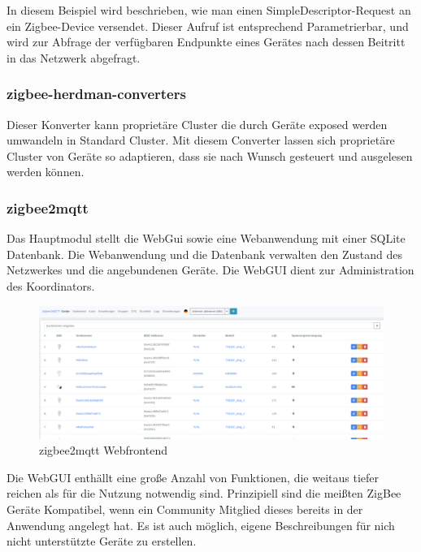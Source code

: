 In diesem Beispiel wird beschrieben, wie man einen SimpleDescriptor-Request an ein Zigbee-Device versendet. Dieser Aufruf ist entsprechend Parametrierbar,
und wird zur Abfrage der verfügbaren Endpunkte eines Gerätes nach dessen Beitritt in das Netzwerk abgefragt.

\subsubsection{zigbee-herdman-converters}

Dieser Konverter kann proprietäre Cluster die durch Geräte exposed werden umwandeln in Standard Cluster. Mit diesem Converter lassen sich proprietäre Cluster von Geräte
so adaptieren, dass sie nach Wunsch gesteuert und ausgelesen werden können.

\subsubsection{zigbee2mqtt}

Das Hauptmodul stellt die WebGui sowie eine Webanwendung mit einer SQLite Datenbank. Die Webanwendung und die Datenbank
verwalten den Zustand des Netzwerkes und die angebundenen Geräte. Die WebGUI dient zur Administration des Koordinators. 

\begin{figure}[H]
  \centering
  \includegraphics[width=1\textwidth]{media/z2m.png}
  \caption{zigbee2mqtt Webfrontend}
\end{figure}

Die WebGUI enthällt eine große Anzahl von Funktionen, die weitaus tiefer reichen als für die Nutzung notwendig sind.
Prinzipiell sind die meißten ZigBee Geräte Kompatibel, wenn ein Community Mitglied dieses bereits in der Anwendung
angelegt hat. Es ist auch möglich, eigene Beschreibungen für nich nicht unterstützte Geräte zu erstellen.\\

